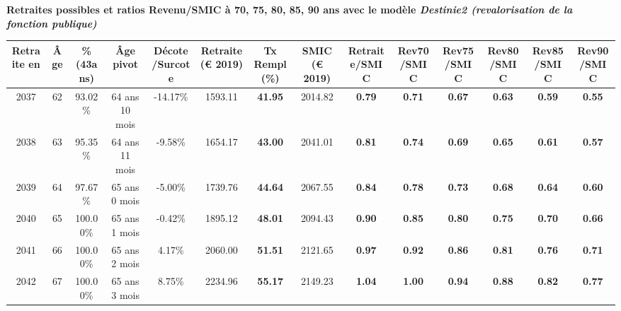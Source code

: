  \vspace{0.1cm} 
{\bf \noindent Retraites possibles et ratios Revenu/SMIC à 70, 75, 80, 85, 90 ans avec le modèle \emph{Destinie2 (revalorisation de la fonction publique)}}  
 
\begin{adjustbox}{max width=\textwidth} 
\begin{tabular}[htb]{|c|c||c|c|c||c|c||c||c|c|c|c|c|c|} 
\hline 
 Retraite en &  Âge &  \%(43ans) &  Âge pivot &  Décote/Surcote &  Retraite (\euro{} 2019) &  Tx Rempl(\%) &  SMIC (\euro{} 2019) &  Retraite/SMIC &  Rev70/SMIC &  Rev75/SMIC &  Rev80/SMIC &  Rev85/SMIC &  Rev90/SMIC \\ 
\hline \hline 
 2037 &  62 &  93.02\% &  64 ans 10 mois &  -14.17\% &  1593.11 &  {\bf 41.95} &  2014.82 &  {\bf {\color{red} 0.79}} &  {\bf {\color{red} 0.71}} &  {\bf {\color{red} 0.67}} &  {\bf {\color{red} 0.63}} &  {\bf {\color{red} 0.59}} &  {\bf {\color{red} 0.55}} \\ 
\hline 
 2038 &  63 &  95.35\% &  64 ans 11 mois &  -9.58\% &  1654.17 &  {\bf 43.00} &  2041.01 &  {\bf {\color{red} 0.81}} &  {\bf {\color{red} 0.74}} &  {\bf {\color{red} 0.69}} &  {\bf {\color{red} 0.65}} &  {\bf {\color{red} 0.61}} &  {\bf {\color{red} 0.57}} \\ 
\hline 
 2039 &  64 &  97.67\% &  65 ans 0 mois &  -5.00\% &  1739.76 &  {\bf 44.64} &  2067.55 &  {\bf {\color{red} 0.84}} &  {\bf {\color{red} 0.78}} &  {\bf {\color{red} 0.73}} &  {\bf {\color{red} 0.68}} &  {\bf {\color{red} 0.64}} &  {\bf {\color{red} 0.60}} \\ 
\hline 
 2040 &  65 &  100.00\% &  65 ans 1 mois &  -0.42\% &  1895.12 &  {\bf 48.01} &  2094.43 &  {\bf {\color{red} 0.90}} &  {\bf {\color{red} 0.85}} &  {\bf {\color{red} 0.80}} &  {\bf {\color{red} 0.75}} &  {\bf {\color{red} 0.70}} &  {\bf {\color{red} 0.66}} \\ 
\hline 
 2041 &  66 &  100.00\% &  65 ans 2 mois &  4.17\% &  2060.00 &  {\bf 51.51} &  2121.65 &  {\bf {\color{red} 0.97}} &  {\bf {\color{red} 0.92}} &  {\bf {\color{red} 0.86}} &  {\bf {\color{red} 0.81}} &  {\bf {\color{red} 0.76}} &  {\bf {\color{red} 0.71}} \\ 
\hline 
 2042 &  67 &  100.00\% &  65 ans 3 mois &  8.75\% &  2234.96 &  {\bf 55.17} &  2149.23 &  {\bf 1.04} &  {\bf 1.00} &  {\bf {\color{red} 0.94}} &  {\bf {\color{red} 0.88}} &  {\bf {\color{red} 0.82}} &  {\bf {\color{red} 0.77}} \\ 
\hline 
\hline 
\end{tabular} 
\end{adjustbox} 
 
